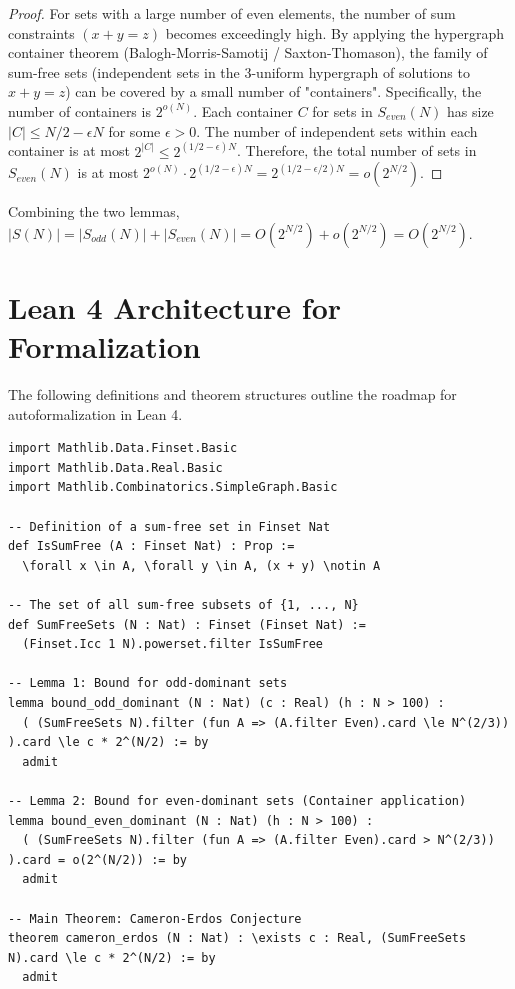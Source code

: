 \documentclass[11pt,a4paper]{article}
\begin{document}
\begin{proof}
For sets with a large number of even elements, the number of sum constraints $(x+y=z)$ becomes exceedingly high.
By applying the hypergraph container theorem (Balogh-Morris-Samotij / Saxton-Thomason), the family of sum-free sets (independent sets in the 3-uniform hypergraph of solutions to $x+y=z$) can be covered by a small number of "containers".
Specifically, the number of containers is $2^{o(N)}$.
Each container $C$ for sets in $S_{even}(N)$ has size $|C| \leq N/2 - \epsilon N$ for some $\epsilon > 0$.
The number of independent sets within each container is at most $2^{|C|} \leq 2^{(1/2 - \epsilon)N}$.
Therefore, the total number of sets in $S_{even}(N)$ is at most $2^{o(N)} \cdot 2^{(1/2 - \epsilon)N} = 2^{(1/2 - \epsilon/2)N} = o(2^{N/2})$.
\end{proof}

Combining the two lemmas, $|S(N)| = |S_{odd}(N)| + |S_{even}(N)| = O(2^{N/2}) + o(2^{N/2}) = O(2^{N/2})$.

\section{Lean 4 Architecture for Formalization}

The following definitions and theorem structures outline the roadmap for autoformalization in Lean 4.

\begin{lstlisting}[basicstyle=\ttfamily\small, breaklines=true]
import Mathlib.Data.Finset.Basic
import Mathlib.Data.Real.Basic
import Mathlib.Combinatorics.SimpleGraph.Basic

-- Definition of a sum-free set in Finset Nat
def IsSumFree (A : Finset Nat) : Prop :=
  \forall x \in A, \forall y \in A, (x + y) \notin A

-- The set of all sum-free subsets of {1, ..., N}
def SumFreeSets (N : Nat) : Finset (Finset Nat) :=
  (Finset.Icc 1 N).powerset.filter IsSumFree

-- Lemma 1: Bound for odd-dominant sets
lemma bound_odd_dominant (N : Nat) (c : Real) (h : N > 100) :
  ( (SumFreeSets N).filter (fun A => (A.filter Even).card \le N^(2/3)) ).card \le c * 2^(N/2) := by
  admit

-- Lemma 2: Bound for even-dominant sets (Container application)
lemma bound_even_dominant (N : Nat) (h : N > 100) :
  ( (SumFreeSets N).filter (fun A => (A.filter Even).card > N^(2/3)) ).card = o(2^(N/2)) := by
  admit

-- Main Theorem: Cameron-Erdos Conjecture
theorem cameron_erdos (N : Nat) : \exists c : Real, (SumFreeSets N).card \le c * 2^(N/2) := by
  admit
\end{lstlisting}
\end{document}
